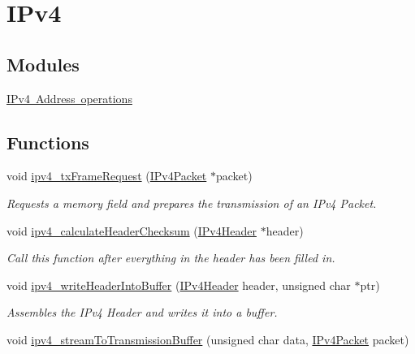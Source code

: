 \hypertarget{group__ip}{}\section{I\+Pv4}
\label{group__ip}
\subsection*{Modules}
\begin{DoxyCompactItemize}
\item 
\mbox{\hyperlink{group__ip__operations}{I\+Pv4 Address operations}}
\end{DoxyCompactItemize}
\subsection*{Functions}
\begin{DoxyCompactItemize}
\item 
void \mbox{\hyperlink{group__ip_ga201c03909f1133c33424a0b9a27097cd}{ipv4\+\_\+tx\+Frame\+Request}} (\mbox{\hyperlink{ipv4_types_8h_a1a3db8172a6bdf4bb1957929ca11710c}{I\+Pv4\+Packet}} $\ast$packet)
\begin{DoxyCompactList}\small\item\em Requests a memory field and prepares the transmission of an I\+Pv4 Packet. \end{DoxyCompactList}\item 
void \mbox{\hyperlink{group__ip_ga09274e15872e0cab31afe677f92a0865}{ipv4\+\_\+calculate\+Header\+Checksum}} (\mbox{\hyperlink{ipv4_types_8h_a2156b3eb915651d02d24799ac03a602b}{I\+Pv4\+Header}} $\ast$header)
\begin{DoxyCompactList}\small\item\em Call this function after everything in the header has been filled in. \end{DoxyCompactList}\item 
void \mbox{\hyperlink{group__ip_gae8665fdfac6d01c77647dbc70010bcf7}{ipv4\+\_\+write\+Header\+Into\+Buffer}} (\mbox{\hyperlink{ipv4_types_8h_a2156b3eb915651d02d24799ac03a602b}{I\+Pv4\+Header}} header, unsigned char $\ast$ptr)
\begin{DoxyCompactList}\small\item\em Assembles the I\+Pv4 Header and writes it into a buffer. \end{DoxyCompactList}\item 
void \mbox{\hyperlink{group__ip_ga6b56766f821375422e6457b30c26d9f4}{ipv4\+\_\+stream\+To\+Transmission\+Buffer}} (unsigned char data, \mbox{\hyperlink{ipv4_types_8h_a1a3db8172a6bdf4bb1957929ca11710c}{I\+Pv4\+Packet}} packet)

\end{DoxyCompactItemize}

